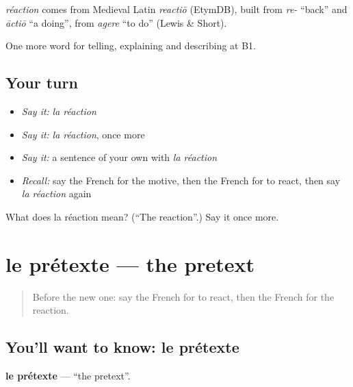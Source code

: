\begin{cousinweb}
\emph{réaction} comes from Medieval Latin \emph{reactiō} (EtymDB), built from \emph{re-} \textquotedblleft{}back\textquotedblright{} and \emph{āctiō} \textquotedblleft{}a doing\textquotedblright{}, from \emph{agere} \textquotedblleft{}to do\textquotedblright{} (Lewis \& Short).
\end{cousinweb}

\begin{grammarlens}[title={What you've built}]
One more word for telling, explaining and describing at B1.
\end{grammarlens}

\subsection*{Your turn}
\begin{itemize}
\raggedright
  \item \emph{Say it:} \emph{la réaction}
  \item \emph{Say it:} \emph{la réaction}, once more
  \item \emph{Say it:} a sentence of your own with \emph{la réaction}
  \item \emph{Recall:} say the French for the motive, then the French for to react, then say \emph{la réaction} again
\end{itemize}

\begin{tcolorbox}[breakable,colback=teal!4,colframe=teal!35!black,title={Before you move on}]
What does la réaction mean? (\textquotedblleft{}The reaction\textquotedblright{}.) Say it once more.
\end{tcolorbox}
\section[le prétexte]{le prétexte — the pretext}

\label{lesson:FR-C351-pretexte}



\begin{quote}
Before the new one: say the French for to react, then the French for the reaction.
\end{quote}

\subsection*{You'll want to know: le prétexte}
\textbf{le prétexte} — \textquotedblleft{}the pretext\textquotedblright{}.

